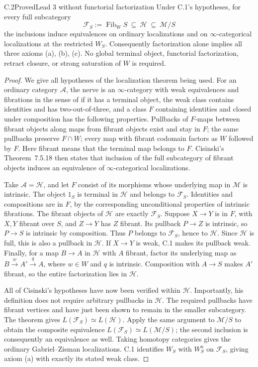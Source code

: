\begin{claim}{C.2}{Proved}{Lead 3 without functorial factorization}
Under C.1's hypotheses, for every full subcategory
\[
 \mathcal F_S:=\operatorname{Fib}_W S\ \subseteq\
 \mathcal H\ \subseteq\ \mathcal M/S
\]
the inclusions induce equivalences on ordinary localizations and on
$\infty$-categorical localizations at the restricted $W_S$.
Consequently factorization alone implies all three axioms (a), (b), (c).
No global terminal object, functorial factorization, retract closure,
or strong saturation of $W$ is required.
\end{claim}
\begin{proof}
We give all hypotheses of the localization theorem being used.
For an ordinary category $\mathcal A$, the nerve is an
$\infty$-category with weak equivalences and fibrations in the sense
of \citet[Definitions~7.4.6 and 7.4.12]{RESCisinski2019} if it has a
terminal object, the weak class contains identities and has
two-out-of-three, and a class $F$ containing identities and closed
under composition has the following properties. Pullbacks of
$F$-maps between fibrant objects along maps from fibrant objects
exist and stay in $F$; the same pullbacks preserve $F\cap W$;
every map with fibrant codomain factors as $W$ followed by $F$.
Here fibrant means that the terminal map belongs to $F$.
Cisinski's Theorem~7.5.18 then states that inclusion of the full
subcategory of fibrant objects induces an equivalence of
$\infty$-categorical localizations.

Take $\mathcal A=\mathcal H$, and let $F$ consist of its morphisms
whose underlying map in $\mathcal M$ is intrinsic. The object
$1_S$ is terminal in $\mathcal H$ and belongs to $\mathcal F_S$.
Identities and compositions are in $F$, by the corresponding
unconditional properties of intrinsic fibrations. The fibrant
objects of $\mathcal H$ are exactly $\mathcal F_S$.
Suppose $X\to Y$ is in $F$, with $X,Y$ fibrant over $S$, and
$Z\to Y$ has $Z$ fibrant. Its pullback $P\to Z$ is intrinsic,
so $P\to S$ is intrinsic by composition. Thus $P$ belongs to
$\mathcal F_S$, hence to $\mathcal H$. Since $\mathcal H$ is full,
this is also a pullback in $\mathcal H$. If $X\to Y$ is weak,
C.1 makes its pullback weak. Finally, for a map $B\to A$ in
$\mathcal H$ with $A$ fibrant, factor its underlying map as
$B\xrightarrow w A'\xrightarrow q A$, where $w\in W$ and $q$
is intrinsic. Composition with $A\to S$ makes $A'$ fibrant,
so the entire factorization lies in $\mathcal H$.

All of Cisinski's hypotheses have now been verified within
$\mathcal H$. Importantly, his definition does not require arbitrary
pullbacks in $\mathcal H$. The required pullbacks have fibrant
vertices and have just been shown to remain in the smaller
subcategory. The theorem gives $L(\mathcal F_S)\simeq L(\mathcal H)$.
Apply the same argument to $\mathcal M/S$ to obtain the composite
equivalence $L(\mathcal F_S)\simeq L(\mathcal M/S)$; the second
inclusion is consequently an equivalence as well. Taking homotopy
categories gives the ordinary Gabriel--Zisman localizations.
C.1 identifies $W_S$ with $W_S^u$ on $\mathcal F_S$, giving
axiom (a) with exactly its stated weak class.
\end{proof}

